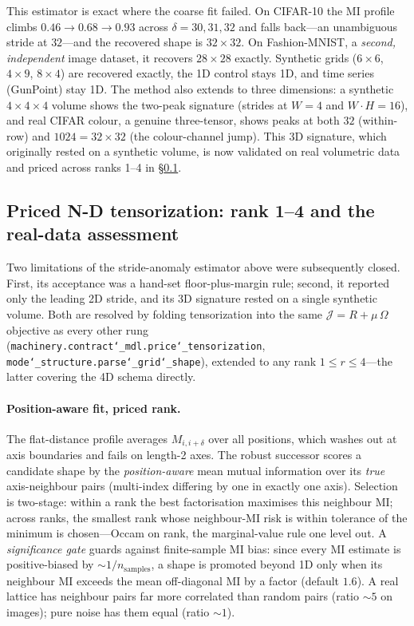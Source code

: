 \documentclass[11pt]{article}
\newcommand{\allowbreakhere}{\discretionary{}{}{}}
\newcommand{\code}[1]{\texttt{\def\_{\char`_\allowbreakhere}#1}}
\begin{document}
This estimator is exact where the coarse fit failed. On CIFAR-10 the MI profile climbs
$0.46\to0.68\to0.93$ across $\delta=30,31,32$ and falls back---an unambiguous stride at $32$---and the
recovered shape is $32\times32$. On Fashion-MNIST, a \emph{second, independent} image dataset, it
recovers $28\times28$ exactly. Synthetic grids ($6\times6$, $4\times9$, $8\times4$) are recovered
exactly, the 1D control stays 1D, and time series (GunPoint) stay 1D. The method also extends to
three dimensions: a synthetic $4\times4\times4$ volume shows the two-peak signature (strides at $W=4$
and $W\!\cdot\!H=16$), and real CIFAR colour, a genuine three-tensor, shows peaks at both $32$
(within-row) and $1024=32\times32$ (the colour-channel jump). This 3D signature, which originally rested
on a synthetic volume, is now validated on real volumetric data and priced across ranks 1--4 in
\S\ref{sec:priced-tensor}.

\subsection{Priced N-D tensorization: rank 1--4 and the real-data assessment}
\label{sec:priced-tensor}

Two limitations of the stride-anomaly estimator above were subsequently closed. First, its acceptance
was a hand-set floor-plus-margin rule; second, it reported only the leading 2D stride, and its 3D signature
rested on a single synthetic volume. Both are resolved by folding tensorization into the same
$\mathcal J=R+\mu\,\Omega$ objective as every other rung (\code{machinery.contract\_mdl.price\_tensorization},
\code{mode\_structure.parse\_grid\_shape}), extended to any rank $1\le r\le 4$---the latter covering the
4D schema directly.

\paragraph{Position-aware fit, priced rank.} The flat-distance profile averages $M_{i,i+\delta}$ over all
positions, which washes out at axis boundaries and fails on length-2 axes. The robust successor scores a
candidate shape by the \emph{position-aware} mean mutual information over its \emph{true} axis-neighbour
pairs (multi-index differing by one in exactly one axis). Selection is two-stage: within a rank the best
factorisation maximises this neighbour MI; across ranks, the smallest rank whose neighbour-MI risk is
within tolerance of the minimum is chosen---Occam on rank, the marginal-value rule one level out. A
\emph{significance gate} guards against finite-sample MI bias: since every MI estimate is positive-biased
by ${\sim}1/n_{\text{samples}}$, a shape is promoted beyond 1D only when its neighbour MI exceeds the mean
off-diagonal MI by a factor (default $1.6$). A real lattice has neighbour pairs far more correlated than
random pairs (ratio ${\sim}5$ on images); pure noise has them equal (ratio ${\sim}1$).
\end{document}
